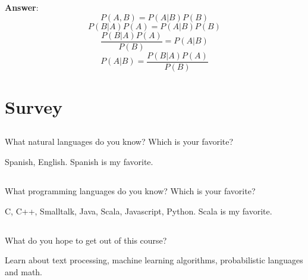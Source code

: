 \documentclass[11pt,letterpaper]{article}
\theoremstyle{definition}
\begin{document}
\textbf{Answer}:
\[
P(A,B) = P(A|B)P(B)
\]
\[
P(B|A)P(A) = P(A|B)P(B)
\]
\[
\dfrac{P(B|A)P(A)}{P(B)} = P(A|B)
\]
\[
 P(A|B)=\dfrac{P(B|A)P(A)}{P(B)}
\]


\section{Survey}

\subsection{}
What natural languages do you know?  Which is your favorite?

Spanish, English. Spanish is my favorite.

\subsection{}
What programming languages do you know?  Which is your favorite?

C, C++, Smalltalk, Java, Scala, Javascript, Python. Scala is my favorite.

\subsection{}
What do you hope to get out of this course?

Learn about text processing, machine learning algorithms, probabilistic languages and math. 

%
%
\end{document}
